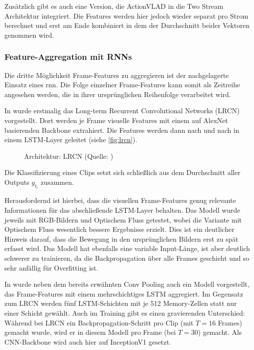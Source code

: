Zusätzlich gibt es auch eine Version, die ActionVLAD in die Two Stream Architektur integriert.
Die Features werden hier jedoch wieder separat pro Strom berechnet und erst am Ende kombiniert in dem der Durchschnitt beider Vektoren genommen wird.


\subsubsection{Feature-Aggregation mit RNNs}

Die dritte Möglichkeit Frame-Features zu aggregieren ist der nachgelagerte Einsatz eines \gls{rnn}.
Die Folge einzelner Frame-Features kann somit als Zeitreihe angesehen werden, die in ihrer ursprünglichen Reihenfolge verarbeitet wird.

In \cite{Donahue14} wurde erstmalig das Long-term Recurrent Convolutional Networks (LRCN) vorgestellt.
Dort werden je Frame visuelle Features mit einem auf AlexNet basierenden Backbone extrahiert.
Die Features werden dann nach und nach in einem LSTM-Layer geleitet (siehe \autoref{fig:lrcn}).

\begin{figure}[h!]
    \centering
    \caption{Architektur: LRCN (Quelle: \cite{Donahue14})}
    \label{fig:lrcn}
\end{figure}

Die Klassifizierung eines Clips setzt sich schließlich aus dem Durchschnitt aller Outputs $y_{t_i}$ zusammen.

Herausfordernd ist hierbei, dass die visuellen Frame-Features genug relevante Informationen für das abschließende LSTM-Layer behalten.
Das Modell wurde jeweils mit RGB-Bildern und Optischem Fluss getestet, wobei die Variante mit Optischem Fluss wesentlich bessere Ergebnisse erzielt.
Dies ist \ua ein deutlicher Hinweis darauf, dass die Bewegung in den ursprünglichen Bildern erst zu spät erfasst wird.
Das Modell hat ebenfalls eine variable Input-Länge, ist aber deutlich schwerer zu trainieren, da die Backpropagation über alle Frames geschieht und so sehr anfällig für Overfitting ist.

In \cite{Ng15} wurde neben dem bereits erwähnten Conv Pooling auch ein Modell vorgestellt, das Frame-Features mit einem mehrschichtiges LSTM aggregiert.
Im Gegensatz zum LRCN werden fünf LSTM-Schichten mit je 512 Memory-Zellen statt nur einer Schicht gewählt.
Auch im Training gibt es einen gravierenden Unterschied:
Während bei LRCN ein Backpropagation-Schritt pro Clip (mit $T = 16$ Frames) gemacht wurde, wird er in diesem Modell pro Frame (bei $T = 30$) gemacht.
Als CNN-Backbone wird auch hier auf InceptionV1 gesetzt.


